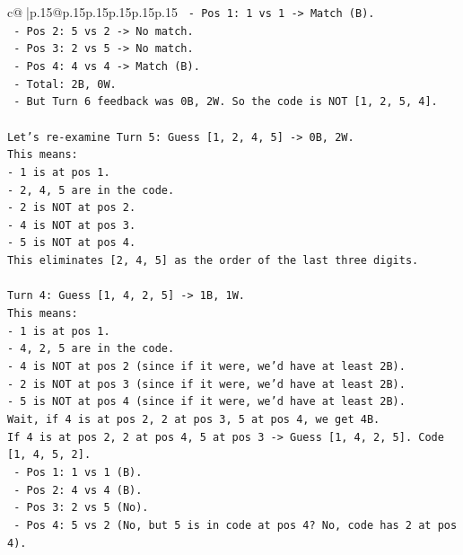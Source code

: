 \documentclass{article}
\begin{document}
{\begin{supertabular}{c@{$\;$}|p{.15\linewidth}@{}p{.15\linewidth}p{.15\linewidth}p{.15\linewidth}p{.15\linewidth}p{.15\linewidth}}
{{{\texttt{    {-} Pos 1: 1 vs 1 {-}> Match (B).} \\
\texttt{    {-} Pos 2: 5 vs 2 {-}> No match.} \\
\texttt{    {-} Pos 3: 2 vs 5 {-}> No match.} \\
\texttt{    {-} Pos 4: 4 vs 4 {-}> Match (B).} \\
\texttt{    {-} Total: 2B, 0W.} \\
\texttt{  {-} But Turn 6 feedback was 0B, 2W. So the code is NOT {[}1, 2, 5, 4{]}.} \\
\\ 
\texttt{Let's re{-}examine Turn 5: Guess {[}1, 2, 4, 5{]} {-}> 0B, 2W.} \\
\texttt{This means:} \\
\texttt{{-} 1 is at pos 1.} \\
\texttt{{-} 2, 4, 5 are in the code.} \\
\texttt{{-} 2 is NOT at pos 2.} \\
\texttt{{-} 4 is NOT at pos 3.} \\
\texttt{{-} 5 is NOT at pos 4.} \\
\texttt{This eliminates {[}2, 4, 5{]} as the order of the last three digits.} \\
\\ 
\texttt{Turn 4: Guess {[}1, 4, 2, 5{]} {-}> 1B, 1W.} \\
\texttt{This means:} \\
\texttt{{-} 1 is at pos 1.} \\
\texttt{{-} 4, 2, 5 are in the code.} \\
\texttt{{-} 4 is NOT at pos 2 (since if it were, we'd have at least 2B).} \\
\texttt{{-} 2 is NOT at pos 3 (since if it were, we'd have at least 2B).} \\
\texttt{{-} 5 is NOT at pos 4 (since if it were, we'd have at least 2B).} \\
\texttt{Wait, if 4 is at pos 2, 2 at pos 3, 5 at pos 4, we get 4B.} \\
\texttt{If 4 is at pos 2, 2 at pos 4, 5 at pos 3 {-}> Guess {[}1, 4, 2, 5{]}. Code {[}1, 4, 5, 2{]}.} \\
\texttt{  {-} Pos 1: 1 vs 1 (B).} \\
\texttt{  {-} Pos 2: 4 vs 4 (B).} \\
\texttt{  {-} Pos 3: 2 vs 5 (No).} \\
\texttt{  {-} Pos 4: 5 vs 2 (No, but 5 is in code at pos 4? No, code has 2 at pos 4).} \\
}}}
\end{supertabular}}
\end{document}
